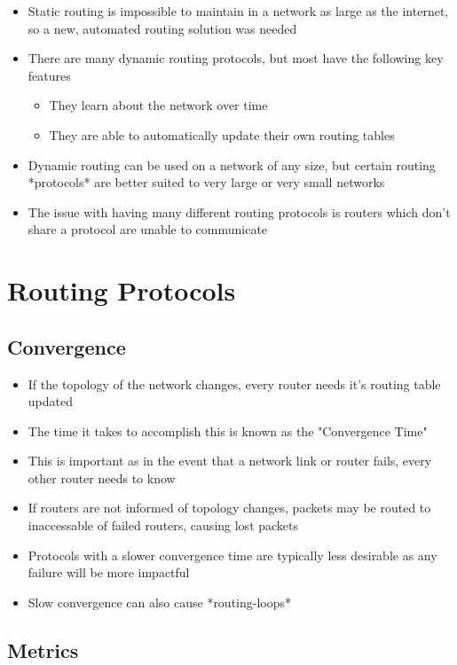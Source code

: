 \begin{itemize}
  \item Static routing is impossible to maintain in a network as large as the internet, so a new, automated routing solution was needed
  \item There are many dynamic routing protocols, but most have the following key features
  \begin{itemize}
    \item They learn about the network over time
    \item They are able to automatically update their own routing tables
  \end{itemize}
  \item Dynamic routing can be used on a network of any size, but certain routing *protocols* are better suited to very large or very small networks
  \item The issue with having many different routing protocols is routers which don't share a protocol are unable to communicate
\end{itemize}

\section*{Routing Protocols}

\subsection*{Convergence}

\begin{itemize}
  \item If the topology of the network changes, every router needs it's routing table updated
  \item The time it takes to accomplish this is known as the "Convergence Time"
  \item This is important as in the event that a network link or router fails, every other router needs to know
  \item If routers are not informed of topology changes, packets may be routed to inaccessable of failed routers, causing lost packets
  \item Protocols with a slower convergence time are typically less desirable as any failure will be more impactful
  \item Slow convergence can also cause *routing-loops*
\end{itemize}

\subsection*{Metrics}

